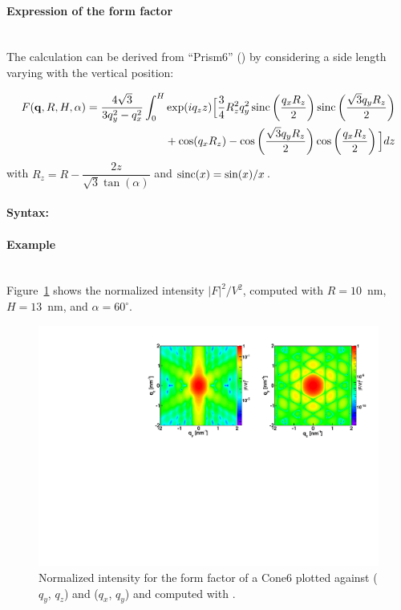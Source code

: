 \paragraph{Expression of the form factor}\mbox{}\\
The
calculation can be derived from ``Prism6'' () by
considering a side length varying with the vertical position:

\begin{align*}
F(\mathbf{q}, R, H, \alpha) = \frac{4\sqrt{3}}{3q_y ^2 - q_x^2}\int_0 ^H &\exp(iq_z z)
\Big[\frac{3}{4}R_z^2q_y^2 \operatorname{sinc}\left(\frac{q_xR_z}{2}\right)\operatorname{sinc}\left(\frac{\sqrt{3}q_y
R_z}{2}\right)\\
&+\cos(q_xR_z)-\cos\left(\frac{\sqrt{3}q_y R_z}{2}\right)\cos\left(\frac{q_xR_z}{2}\right) \Big]dz
\end{align*}
with $R_z=R-\dfrac{2z}{\sqrt{3}\tan(\alpha)}$ and $\operatorname{sinc}(x)=\sin(x)/x$.

\paragraph{Syntax:}  

\paragraph{Example}\mbox{}\\
Figure~\ref{fig:FFCone6Ex} shows the normalized intensity
$|F|^2/V^2$, computed with $R=10$~nm, $H=13$~nm, and
$\alpha=60^{\circ}$.

\begin{figure}[h]
\begin{center}
\includegraphics[width=\textwidth]{Figures/figffcone6}
\end{center}
\caption{Normalized intensity for the form factor of a Cone6 plotted against ($q_y$, $q_z$) and ($q_x$, $q_y$) and computed with .}
\label{fig:FFCone6Ex}
\end{figure}

